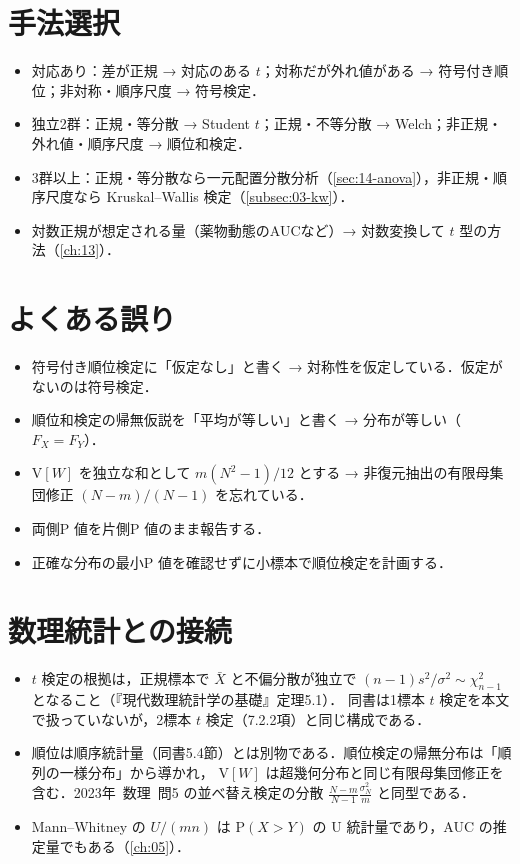 \documentclass[a4paper,11pt,openany]{ltjsbook}
\newcommand{\kakomonSM}[2]{\mbox{#1年 数理 問#2}}
\newcommand{\V}{\mathrm{V}}
\newcommand{\Prob}{\mathrm{P}}
\begin{document}
\section{手法選択}\label{sec:03-choice}
\begin{itemize}
\item 対応あり：差が正規 → 対応のある $t$；対称だが外れ値がある → 符号付き順位；非対称・順序尺度 → 符号検定．
\item 独立2群：正規・等分散 → Student $t$；正規・不等分散 → Welch；非正規・外れ値・順序尺度 → 順位和検定．
\item 3群以上：正規・等分散なら一元配置分散分析（\cref{sec:14-anova}），非正規・順序尺度なら Kruskal--Wallis 検定（\cref{subsec:03-kw}）．
\item 対数正規が想定される量（薬物動態のAUCなど）→ 対数変換して $t$ 型の方法（\cref{ch:13}）．
\end{itemize}

\section{よくある誤り}\label{sec:03-err}
\begin{warnbox}
\begin{itemize}
\item 符号付き順位検定に「仮定なし」と書く → 対称性を仮定している．仮定がないのは符号検定．
\item 順位和検定の帰無仮説を「平均が等しい」と書く → 分布が等しい（$F_X=F_Y$）．
\item $\V[W]$ を独立な和として $m(N^2-1)/12$ とする → 非復元抽出の有限母集団修正 $(N-m)/(N-1)$ を忘れている．
\item 両側P 値を片側P 値のまま報告する．
\item 正確な分布の最小P 値を確認せずに小標本で順位検定を計画する．
\end{itemize}
\end{warnbox}

\section{数理統計との接続}\label{sec:03-link}
\begin{linkbox}
\begin{itemize}
\item $t$ 検定の根拠は，正規標本で $\bar X$ と不偏分散が独立で $(n-1)s^2/\sigma^2\sim\chi^2_{n-1}$ となること（『現代数理統計学の基礎』定理5.1）．
      同書は1標本 $t$ 検定を本文で扱っていないが，2標本 $t$ 検定（7.2.2項）と同じ構成である．
\item 順位は順序統計量（同書5.4節）とは別物である．順位検定の帰無分布は「順列の一様分布」から導かれ，
      $\V[W]$ は超幾何分布と同じ有限母集団修正を含む．\kakomonSM{2023}{5} の並べ替え検定の分散 $\frac{N-m}{N-1}\frac{\sigma_N^2}{m}$ と同型である．
\item Mann--Whitney の $U/(mn)$ は $\Prob(X>Y)$ の U 統計量であり，AUC の推定量でもある（\cref{ch:05}）．
\end{itemize}
\end{linkbox}
\end{document}
